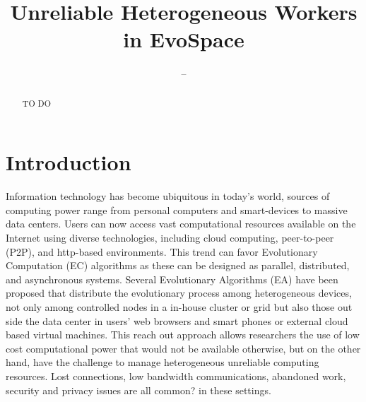 \documentclass{llncs}
\begin{document}
\title{ Unreliable Heterogeneous Workers in EvoSpace }
%
%
\author{--}

\maketitle              %

\begin{abstract}
TO DO
\end{abstract}
%
\section{Introduction}
\label{sec:intro}
Information technology has become ubiquitous in today's world, sources of 
computing power range from personal computers and smart-devices to massive 
data centers. Users can now access vast computational resources available on 
the Internet using diverse technologies, including cloud computing, 
peer-to-peer (P2P), and http-based environments. This trend can favor 
Evolutionary Computation (EC) algorithms as these can be designed as parallel, 
distributed, and asynchronous systems.
Several Evolutionary Algorithms (EA) have been proposed that distribute 
the evolutionary process among heterogeneous devices, not only among controlled
nodes in a in-house cluster or grid but also those out side the data center in
users' web browsers and smart phones or external cloud based virtual machines.
This reach out approach allows researchers the use of low cost computational 
power that would not be available otherwise, but on the other hand, have the 
challenge to manage heterogeneous unreliable computing resources. Lost 
connections, low bandwidth communications, abandoned work, security and privacy
issues are all common? in these settings. 
\end{document}
